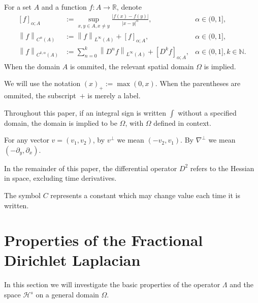 \documentclass[11pt]{amsart}
\theoremstyle{remark}
\theoremstyle{definition}
\newcommand{\R}{\mathbb{R}}
\newcommand{\N}{\mathbb{N}}
\newcommand{\norm}[1]{\left\lVert#1\right\rVert}
\newcommand{\bracket}[1]{\left[ #1 \right]}
\newcommand{\del}{\partial}
\newcommand{\grad}{\nabla}
\newcommand{\HD}{\mathcal{H}}
\begin{document}
For a set $A$ and a function $f:A \to \R$, denote
\begin{align*}
\bracket{f}_{\alpha;A} &:= \sup_{x,y \in A, x \neq y} \frac{|f(x)-f(y)|}{|x-y|^\alpha},  &\alpha \in (0,1], \\
\norm{f}_{C^\alpha(A)} &:= \norm{f}_{L^\infty(A)} + \bracket{f}_{\alpha;A}, & \alpha \in (0,1], \\
\norm{f}_{C^{k,\alpha}(A)} &:= \sum_{n=0}^k \norm{D^n f}_{L^\infty(A)} + \bracket{D^k f}_{\alpha;A}, & \alpha \in (0,1], k \in \N.
\end{align*}
When the domain $A$ is ommited, the relevant spatial domain $\Omega$ is implied.  

We will use the notation $(x)_+ := \max(0,x)$.  When the parentheses are ommited, the subscript~$+$ is merely a label.  

Throughout this paper, if an integral sign is written $\int$ without a specified domain, the domain is implied to be $\Omega$, with $\Omega$ defined in context.  

For any vector $v = (v_1,v_2)$, by $v^\perp$ we mean $(-v_2,v_1)$. By $\grad^\perp$ we mean $(-\del_y, \del_x)$.  

In the remainder of this paper, the differential operator $D^2$ refers to the Hessian in space, excluding time derivatives.  


The symbol $C$ represents a constant which may change value each time it is written.  

\vskip1cm
\section{Properties of the Fractional Dirichlet Laplacian} \label{sec:lambda}

In this section we will investigate the basic properties of the operator $\Lambda$ and the space $\HD^s$ on a general domain $\Omega$.  
\end{document}
